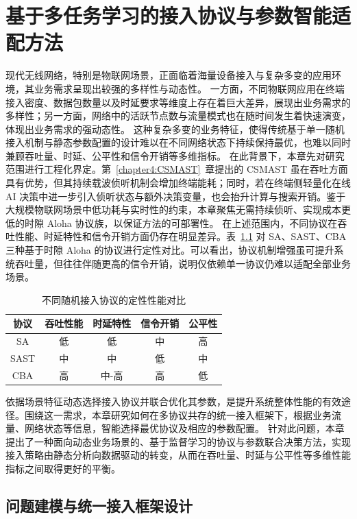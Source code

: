 \chapter{基于多任务学习的接入协议与参数智能适配方法}

\label{chapter5:ai_selector}
现代无线网络，特别是物联网场景，正面临着海量设备接入与复杂多变的应用环境，其业务需求呈现出较强的多样性与动态性。
一方面，不同物联网应用在终端接入密度、数据包数量以及时延要求等维度上存在着巨大差异，展现出业务需求的多样性；另一方面，网络中的活跃节点数与流量模式也在随时间发生着快速演变，体现出业务需求的强动态性。
这种复杂多变的业务特征，使得传统基于单一随机接入机制与静态参数配置的设计难以在不同网络状态下持续保持最优，也难以同时兼顾吞吐量、时延、公平性和信令开销等多维指标。
在此背景下，本章先对研究范围进行工程化界定。第~\ref{chapter4:CSMAST}~章提出的 CSMAST 虽在吞吐方面具有优势，但其持续载波侦听机制会增加终端能耗；同时，若在终端侧轻量化在线 AI 决策中进一步引入侦听状态与额外决策变量，也会抬升计算与搜索开销。鉴于大规模物联网场景中低功耗与实时性的约束，本章聚焦无需持续侦听、实现成本更低的时隙 Aloha 协议族，以保证方法的可部署性。
在上述范围内，不同协议在吞吐性能、时延特性和信令开销方面仍存在明显差异。表~\ref{tab:protocol_comparison} 对 SA、SAST、CBA 三种基于时隙 Aloha 的协议进行定性对比。可以看出，协议机制增强虽可提升系统吞吐量，但往往伴随更高的信令开销，说明仅依赖单一协议仍难以适配全部业务场景。

\begin{table}[htbp]
\centering
\caption{不同随机接入协议的定性性能对比}
\label{tab:protocol_comparison}
\begin{tabular}{ccccc}
\toprule
\textbf{协议} & \textbf{吞吐性能} & \textbf{时延特性} & \textbf{信令开销} & \textbf{公平性} \\
\midrule
SA & 低 & 低 & 中 & 高 \\
SAST & 中 & 中 & 低 & 中 \\
CBA & 高 & 中-高 & 高 & 低 \\
\bottomrule
\end{tabular}
\end{table}

依据场景特征动态选择接入协议并联合优化其参数，是提升系统整体性能的有效途径。围绕这一需求，本章研究如何在多协议共存的统一接入框架下，根据业务流量、网络状态等信息，智能选择最优协议及相应的参数配置。
针对此问题，本章提出了一种面向动态业务场景的、基于监督学习的协议与参数联合决策方法，实现接入策略由静态分析向数据驱动的转变，从而在吞吐量、时延与公平性等多维性能指标之间取得更好的平衡。

\section{问题建模与统一接入框架设计}
\label{sec:chap5_question_modeling}

